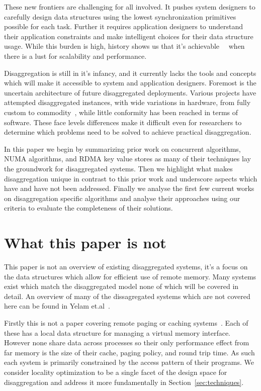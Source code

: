 These new frontiers are challenging for all involved. It pushes system designers
to carefully design data structures using the lowest synchronization primitives
possible for each task. Further it requires application designers to understand
their application constraints and make intelligent choices for their data
structure usage. While this burden is high, history shows us that it's
achievable~\cite{}~ when there is a
lust for scalability and performance.

Disaggregation is still in it's infancy, and it currently lacks the tools and
concepts which will make it accessible to system and application designers.
Foremost is the uncertain architecture of future disaggregated deployments.
Various projects have attempted disaggregated instances, with wide variations in
hardware, from fully custom to
commodity~\cite{dredbox,firebox,machine,legoos}, while little conformity has
been reached in terms of software. These face levels differences make it
difficult even for researchers to determine which problems need to be solved to
achieve practical disaggregation.

In this paper we begin by summarizing prior work on concurrent algorithms, NUMA
algorithms, and RDMA key value stores as many of their techniques lay the
groundwork for disaggregated systems. Then we highlight what makes
disaggregation unique in contrast to this prior work and underscore aspects
which have and have not been addressed. Finally we analyse the first few current
works on disaggregation specific algorithms and analyse their approaches using
our criteria to evaluate the completeness of their solutions.


\section{What this paper is not}

This paper is not an overview of existing disaggregated systems, it's a focus on
the data structures which allow for efficient use of remote memory. Many systems
exist which match the disaggregated model none of which will be covered in
detail. An overview of many of the dissagregated systems which are not covered
here can be found in Yelam et.al~\cite{how-to-build}.

Firstly this is not a paper covering remote paging or caching
systems~\cite{fastswap,kona,infiniswap,leap,legoos}. Each of these has a local
data structure for managing a virtual memory interface.  However none share data
across processes so their only performance effect from far memory is the size of
their cache, paging policy, and round trip time. As such each system is
primarily constrained by the access pattern of their programs. We consider
locality optimization to be a single facet of the design space for
disaggregation and address it more fundamentally in
Section~\ref{sec:techniques}.

